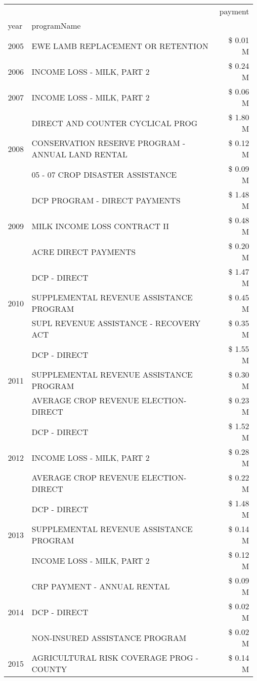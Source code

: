 \begin{tabular}{llr}
\toprule
 &  & payment \\
year & programName &  \\
\midrule
2005 & EWE LAMB REPLACEMENT OR RETENTION & \$ 0.01 M \\
\cline{1-3}
2006 & INCOME LOSS - MILK, PART 2 & \$ 0.24 M \\
\cline{1-3}
2007 & INCOME LOSS - MILK, PART 2 & \$ 0.06 M \\
\cline{1-3}
\multirow[t]{3}{*}{2008} & DIRECT AND COUNTER CYCLICAL PROG & \$ 1.80 M \\
 & CONSERVATION RESERVE PROGRAM - ANNUAL LAND RENTAL & \$ 0.12 M \\
 & 05 - 07 CROP DISASTER ASSISTANCE & \$ 0.09 M \\
\cline{1-3}
\multirow[t]{3}{*}{2009} & DCP PROGRAM - DIRECT PAYMENTS & \$ 1.48 M \\
 & MILK INCOME LOSS CONTRACT II & \$ 0.48 M \\
 & ACRE DIRECT PAYMENTS & \$ 0.20 M \\
\cline{1-3}
\multirow[t]{3}{*}{2010} & DCP - DIRECT & \$ 1.47 M \\
 & SUPPLEMENTAL REVENUE ASSISTANCE PROGRAM & \$ 0.45 M \\
 & SUPL REVENUE ASSISTANCE - RECOVERY ACT & \$ 0.35 M \\
\cline{1-3}
\multirow[t]{3}{*}{2011} & DCP - DIRECT & \$ 1.55 M \\
 & SUPPLEMENTAL REVENUE ASSISTANCE PROGRAM & \$ 0.30 M \\
 & AVERAGE CROP REVENUE ELECTION-DIRECT & \$ 0.23 M \\
\cline{1-3}
\multirow[t]{3}{*}{2012} & DCP - DIRECT & \$ 1.52 M \\
 & INCOME LOSS - MILK, PART 2 & \$ 0.28 M \\
 & AVERAGE CROP REVENUE ELECTION-DIRECT & \$ 0.22 M \\
\cline{1-3}
\multirow[t]{3}{*}{2013} & DCP - DIRECT & \$ 1.48 M \\
 & SUPPLEMENTAL REVENUE ASSISTANCE PROGRAM & \$ 0.14 M \\
 & INCOME LOSS - MILK, PART 2 & \$ 0.12 M \\
\cline{1-3}
\multirow[t]{3}{*}{2014} & CRP PAYMENT - ANNUAL RENTAL & \$ 0.09 M \\
 & DCP - DIRECT & \$ 0.02 M \\
 & NON-INSURED ASSISTANCE PROGRAM & \$ 0.02 M \\
\cline{1-3}
\multirow[t]{3}{*}{2015} & AGRICULTURAL RISK COVERAGE PROG - COUNTY & \$ 0.14 M \\

\end{tabular}
